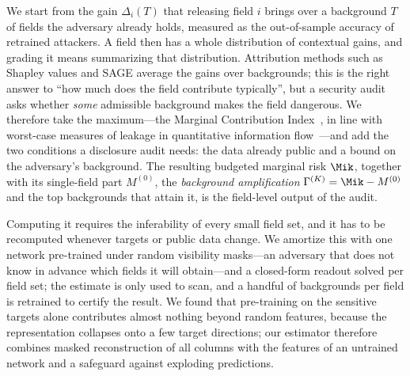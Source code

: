 We start from the gain $\Delta_i(T)$ that releasing field $i$ brings over a background $T$ of fields
the adversary already holds, measured as the out-of-sample accuracy of retrained attackers. A field
then has a whole distribution of contextual gains, and grading it means summarizing that
distribution. Attribution methods such as Shapley values and SAGE average the gains over backgrounds;
this is the right answer to ``how much does the field contribute typically'', but a security audit
asks whether \emph{some} admissible background makes the field dangerous. We therefore take the
maximum---the Marginal Contribution Index~\cite{catav2021mci}, in line with worst-case measures of
leakage in quantitative information flow~\cite{smith2009qif,alvim2012gleakage}---and add the two
conditions a disclosure audit needs: the data already public and a bound on the adversary's
background. The resulting budgeted marginal risk $\Mik$, together with its single-field part
$M^{(0)}$, the \emph{background amplification} $\Gamma^{(K)}=\Mik-M^{(0)}$ and the top backgrounds
that attain it, is the field-level output of the audit.

Computing it requires the inferability of every small field set, and it has to be recomputed
whenever targets or public data change. We amortize this with one network pre-trained under random
visibility masks---an adversary that does not know in advance which fields it will obtain---and a
closed-form readout solved per field set; the estimate is only used to scan, and a handful of
backgrounds per field is retrained to certify the result. We found that pre-training on the
sensitive targets alone contributes almost nothing beyond random features, because the representation
collapses onto a few target directions; our estimator therefore combines masked reconstruction of all columns with the
features of an untrained network and a safeguard against exploding predictions.

